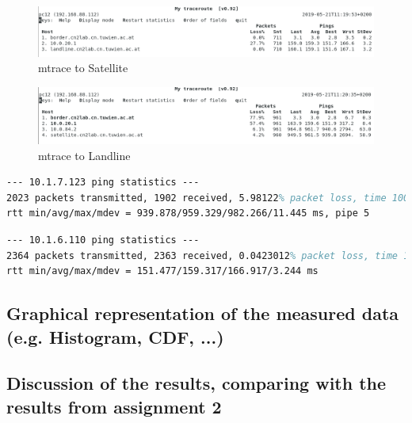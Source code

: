 \documentclass[parskip=full]{scrartcl}
\begin{document}
\begin{figure}[ht]
    \centering
   \includegraphics[width=\textwidth]{images/mytraceroute1.png} 
    \caption{mtrace to Satellite}
    \label{fig:mtraceSatellite}
\end{figure}

\begin{figure}[ht]
    \centering
   \includegraphics[width=\textwidth]{images/mytraceroute2.png} 
    \caption{mtrace to Landline}
    \label{fig:mtraceLandline}
\end{figure}


\begin{lstlisting}[language=tex, breaklines, frame=single, caption={Landline Network Parameters}, label=lst:landlineNetwork, float, floatplacement=h]
--- 10.1.7.123 ping statistics ---
2023 packets transmitted, 1902 received, 5.98122% packet loss, time 1004ms
rtt min/avg/max/mdev = 939.878/959.329/982.266/11.445 ms, pipe 5
\end{lstlisting}

\begin{lstlisting}[language=tex, breaklines, frame=single, caption={Landline Network Parameters}, label=lst:landlineNetwork, float, floatplacement=h]
--- 10.1.6.110 ping statistics ---
2364 packets transmitted, 2363 received, 0.0423012% packet loss, time 1105ms
rtt min/avg/max/mdev = 151.477/159.317/166.917/3.244 ms
\end{lstlisting}


\subsection{Graphical representation of the measured data (e.g. Histogram, CDF, ...)}
\subsection{Discussion of the results, comparing with the results from assignment 2}




\end{document}
